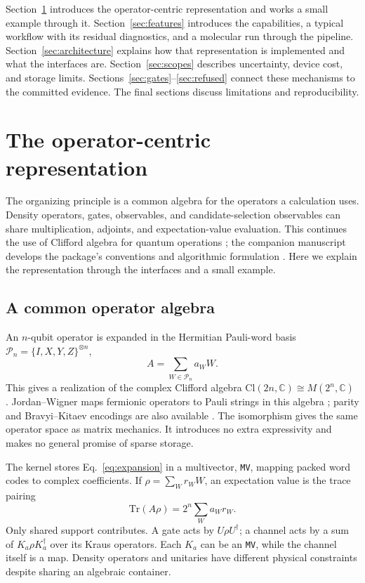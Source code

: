 \documentclass[aps,pra,reprint,superscriptaddress,nofootinbib,floatfix,
  showkeys]{revtex4-2}
\begin{document}
Section~\ref{sec:operator} introduces the operator-centric representation and
works a small example through it.
Section~\ref{sec:features} introduces the capabilities, a typical workflow with
its residual diagnostics, and a molecular run through the pipeline.
Section~\ref{sec:architecture} explains how that representation is implemented
and what the interfaces are.
Section~\ref{sec:scopes} describes uncertainty, device cost, and storage limits.
Sections~\ref{sec:gates}--\ref{sec:refused} connect these mechanisms to the
committed evidence. The final sections discuss limitations and reproducibility.

\section{The operator-centric representation}
\label{sec:operator}

The organizing principle is a common algebra for the operators a calculation
uses. Density operators, gates, observables, and candidate-selection
observables can share multiplication, adjoints, and expectation-value
evaluation. This continues the use of Clifford algebra for quantum
operations \cite{somaroo1998operations}; the companion manuscript develops
the package's conventions and algorithmic formulation
\cite{utama2026operatorcentric}. Here we explain the representation through
the interfaces and a small example.

\subsection{A common operator algebra}
\label{sec:operator-algebra}

An $n$-qubit operator is expanded in the Hermitian Pauli-word basis
$\mathcal{P}_n=\{I,X,Y,Z\}^{\otimes n}$,
\begin{equation}
 A=\sum_{W\in\mathcal{P}_n}a_W W.
 \label{eq:expansion}
\end{equation}
This gives a realization of the complex Clifford algebra
$\mathrm{Cl}(2n,\mathbb{C})\cong M(2^n,\mathbb{C})$
\cite{hrdina2022clifford,silva2025operator}. Jordan--Wigner maps fermionic
operators to Pauli strings in this algebra \cite{jordan1928}; parity and
Bravyi--Kitaev encodings are also available
\cite{bravyi2002fermionic,seeley2012bravyikitaev}. The isomorphism gives the
same operator space as matrix mechanics. It introduces no extra expressivity
and makes no general promise of sparse storage.

The kernel stores Eq.~\eqref{eq:expansion} in a multivector, \texttt{MV},
mapping packed word codes to complex coefficients. If
$\rho=\sum_W r_W W$, an expectation value is the trace pairing
\begin{equation}
 \mathrm{Tr}(A\rho)=2^n\sum_W a_W r_W.
 \label{eq:trace-pairing}
\end{equation}
Only shared support contributes. A gate acts by $U\rho U^\dagger$; a channel
acts by a sum of $K_a\rho K_a^\dagger$ over its Kraus operators. Each $K_a$
can be an \texttt{MV}, while the channel itself is a map. Density operators
and unitaries have different physical constraints despite sharing an
algebraic container.
\end{document}
